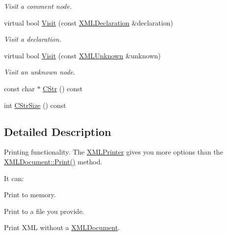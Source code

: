 \begin{DoxyCompactItemize}
\begin{DoxyCompactList}\small\item\em Visit a comment node. \end{DoxyCompactList}\item 
\hypertarget{classtinyxml2_1_1_x_m_l_printer_acfc625b2549304b9c7eb85ebd5c5eb39}{virtual bool \hyperlink{classtinyxml2_1_1_x_m_l_printer_acfc625b2549304b9c7eb85ebd5c5eb39}{Visit} (const \hyperlink{classtinyxml2_1_1_x_m_l_declaration}{X\-M\-L\-Declaration} \&declaration)}\label{classtinyxml2_1_1_x_m_l_printer_acfc625b2549304b9c7eb85ebd5c5eb39}

\begin{DoxyCompactList}\small\item\em Visit a declaration. \end{DoxyCompactList}\item 
\hypertarget{classtinyxml2_1_1_x_m_l_printer_ab8af5455bbf9e4be2663e6642fcd7e32}{virtual bool \hyperlink{classtinyxml2_1_1_x_m_l_printer_ab8af5455bbf9e4be2663e6642fcd7e32}{Visit} (const \hyperlink{classtinyxml2_1_1_x_m_l_unknown}{X\-M\-L\-Unknown} \&unknown)}\label{classtinyxml2_1_1_x_m_l_printer_ab8af5455bbf9e4be2663e6642fcd7e32}

\begin{DoxyCompactList}\small\item\em Visit an unknown node. \end{DoxyCompactList}\item 
const char $\ast$ \hyperlink{classtinyxml2_1_1_x_m_l_printer_a4a1b788e11b540921ec50687cd2b24a9}{C\-Str} () const 
\item 
int \hyperlink{classtinyxml2_1_1_x_m_l_printer_a02c3c5f8c6c007dcbaf10595d9e22bf0}{C\-Str\-Size} () const 
\end{DoxyCompactItemize}


\subsection{Detailed Description}
Printing functionality. The \hyperlink{classtinyxml2_1_1_x_m_l_printer}{X\-M\-L\-Printer} gives you more options than the \hyperlink{classtinyxml2_1_1_x_m_l_document_a686ea28672c0e0c60383ec28148c1ac0}{X\-M\-L\-Document\-::\-Print()} method.

It can\-:
\begin{DoxyEnumerate}
\item Print to memory.
\item Print to a file you provide.
\item Print X\-M\-L without a \hyperlink{classtinyxml2_1_1_x_m_l_document}{X\-M\-L\-Document}.
\end{DoxyEnumerate}

